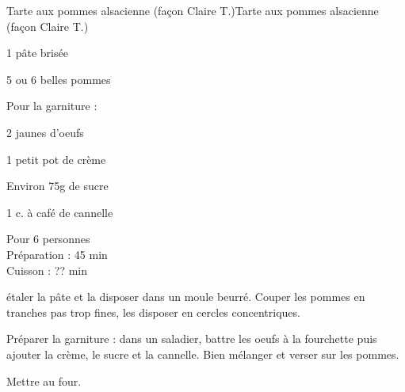 \begin{recette}{Tarte aux pommes alsacienne (façon Claire T.)}{Tarte aux pommes alsacienne (façon Claire T.)}

\begin{ingredients}
1 pâte brisée\par
5 ou 6 belles pommes\par
Pour la garniture :\par
2 jaunes d'oeufs\par
1 petit pot de crème\par
Environ 75g de sucre\par
1 c. à café de cannelle\par
\end{ingredients}

\begin{infos}
Pour 6 personnes\\
Préparation : 45 min\\
Cuisson : ?? min\\
\end{infos}

\begin{etapes}
\item étaler la pâte et la disposer dans un moule beurré. Couper les pommes en tranches pas trop fines, les disposer en cercles concentriques.
\item Préparer la garniture : dans un saladier, battre les oeufs à la fourchette puis ajouter la crème, le sucre et la cannelle. Bien mélanger et verser sur les pommes.
\item Mettre au four.
\end{etapes}

\end{recette}